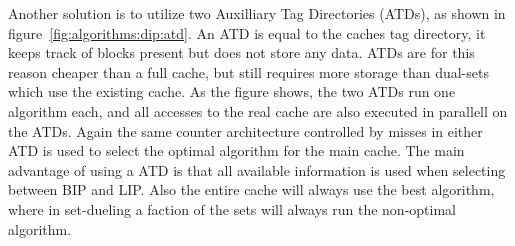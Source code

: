 Another solution is to utilize two Auxilliary Tag Directories (ATDs), as shown in figure~\ref{fig:algorithms:dip:atd}.
An ATD is equal to the caches tag directory, it keeps track of blocks present but does not store any data.
ATDs are for this reason cheaper than a full cache, but still requires more storage than dual-sets which use the existing cache.
As the figure shows, the two ATDs run one algorithm each, and all accesses to the real cache are also executed in parallell on the ATDs.
Again the same counter architecture controlled by misses in either ATD is used to select the optimal algorithm for the main cache.
The main advantage of using a ATD is that all available information is used when selecting between BIP and LIP.
Also the entire cache will always use the best algorithm, where in set-dueling a faction of the sets will always run the non-optimal algorithm.